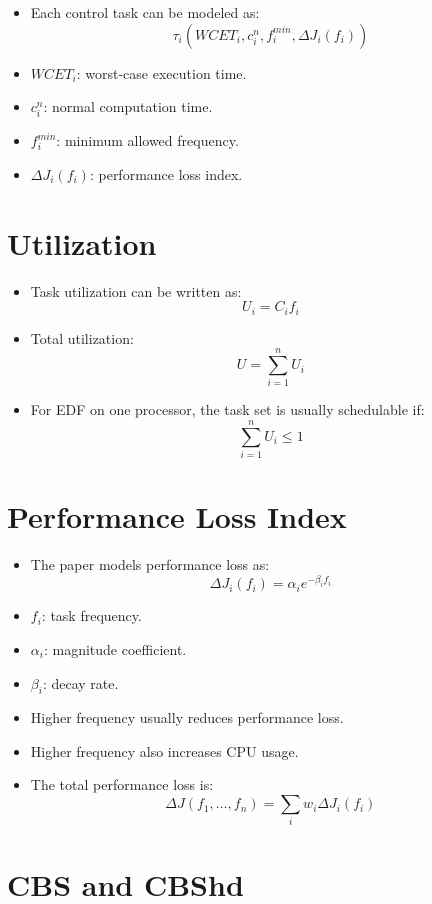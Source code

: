 \documentclass[a4paper,11pt]{article}
\begin{document}
\begin{itemize}
    \item Each control task can be modeled as:
    \[
        \tau_i(WCET_i, c_i^n, f_i^{min}, \Delta J_i(f_i))
    \]
    \item $WCET_i$: worst-case execution time.
    \item $c_i^n$: normal computation time.
    \item $f_i^{min}$: minimum allowed frequency.
    \item $\Delta J_i(f_i)$: performance loss index.
\end{itemize}

\section*{Utilization}

\begin{itemize}
    \item Task utilization can be written as:
    \[
        U_i = C_i f_i
    \]
    \item Total utilization:
    \[
        U = \sum_{i=1}^{n} U_i
    \]
    \item For EDF on one processor, the task set is usually schedulable if:
    \[
        \sum_{i=1}^{n} U_i \leq 1
    \]
\end{itemize}

\section*{Performance Loss Index}

\begin{itemize}
    \item The paper models performance loss as:
    \[
        \Delta J_i(f_i) = \alpha_i e^{-\beta_i f_i}
    \]
    \item $f_i$: task frequency.
    \item $\alpha_i$: magnitude coefficient.
    \item $\beta_i$: decay rate.
    \item Higher frequency usually reduces performance loss.
    \item Higher frequency also increases CPU usage.
    \item The total performance loss is:
    \[
        \Delta J(f_1,\ldots,f_n) = \sum_i w_i \Delta J_i(f_i)
    \]
\end{itemize}

\section*{CBS and CBShd}
\end{document}
